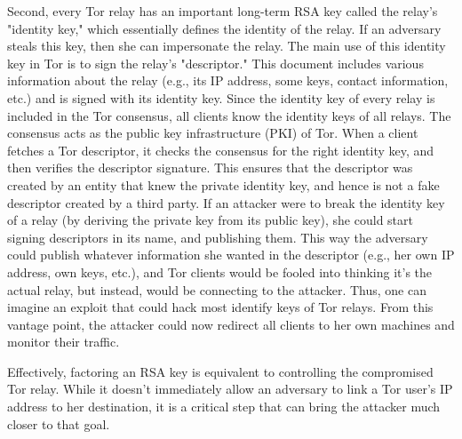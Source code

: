 Second, every Tor relay has an important long-term RSA key called the relay's "identity key," which essentially defines the identity of the relay. If an adversary steals this key, then she can impersonate the relay. The main use of this identity key in Tor is to sign the relay's "descriptor." This document includes various information about the relay (e.g., its IP address, some keys, contact information, etc.) and is signed with its identity key. Since the identity key of every relay is included in the Tor consensus, all clients know the identity keys of all relays. The consensus acts as the public key infrastructure (PKI) of Tor. When a client fetches a Tor descriptor, it checks the consensus for the right identity key, and then verifies the descriptor signature. This ensures that the descriptor was created by an entity that knew the private
identity key, and hence is not a fake descriptor created by a third party. If an attacker were to break the identity key of a relay (by deriving the private key from its public key), she could start signing descriptors in its name, and publishing them. This way the adversary could publish whatever information she wanted in the descriptor (e.g., her own IP address, own keys, etc.), and Tor clients would be fooled into thinking it's the actual relay, but instead, would be connecting to the attacker. Thus, one can imagine an exploit that could hack most identify keys of Tor relays. From this vantage point, the attacker could now redirect all clients to her own machines and monitor their traffic. 

Effectively, factoring an RSA key is equivalent to controlling the compromised Tor relay. While it doesn't immediately allow an adversary to link a Tor user's IP address to her destination, it is a critical step that can bring the attacker much closer to that goal.
